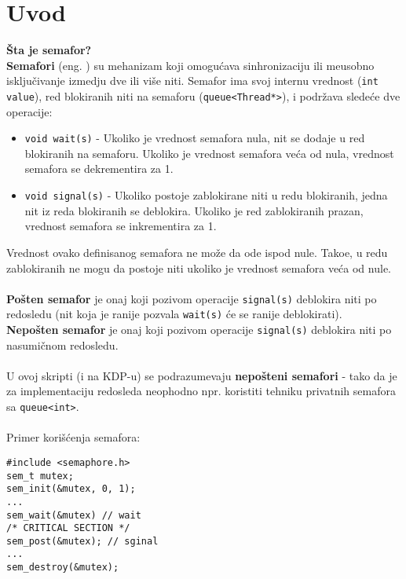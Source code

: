 \section{Uvod}
\textbf{\v{S}ta je semafor?}\\
\textbf{Semafori} (eng. ) su mehanizam koji omogu\'{c}ava sinhronizaciju ili me\dj{}usobno isklju\v{c}ivanje izmedju dve ili vi\v{s}e niti. Semafor ima svoj internu vrednost (\texttt{int value}), red blokiranih niti na semaforu (\texttt{queue<Thread*>}), i podr\v{z}ava slede\'{c}e dve operacije:
\begin{itemize}
    \item \texttt{void wait(s)} - Ukoliko je vrednost semafora nula, nit se dodaje u red blokiranih na semaforu. Ukoliko je vrednost semafora ve\'{c}a od nula, vrednost semafora se dekrementira za 1.
    \item \texttt{void signal(s)} - Ukoliko postoje zablokirane niti u redu blokiranih, jedna nit iz reda blokiranih se deblokira. Ukoliko je red zablokiranih prazan, vrednost semafora se inkrementira za 1.
\end{itemize}
Vrednost ovako definisanog semafora ne mo\v{z}e da ode ispod nule. Tako\dj{}e, u redu zablokiranih ne mogu da postoje niti ukoliko je vrednost semafora ve\'{c}a od nule.
\\\\
\textbf{Po\v{s}ten semafor} je onaj koji pozivom operacije \texttt{signal(s)} deblokira niti po  redosledu (nit koja je ranije pozvala \texttt{wait(s)} \'{c}e se ranije deblokirati).\\
\textbf{Nepo\v{s}ten semafor} je onaj koji pozivom operacije \texttt{signal(s)} deblokira niti po nasumi\v{c}nom redosledu.\\\\
U ovoj skripti (i na KDP-u) se podrazumevaju \textbf{nepo\v{s}teni semafori} - tako da je za implementaciju  redosleda neophodno npr. koristiti tehniku privatnih semafora sa \texttt{queue<int>}.
\\\\
Primer kori\v{s}\'{c}enja  semafora:
\begin{lstlisting}
#include <semaphore.h>
sem_t mutex;
sem_init(&mutex, 0, 1);
...
sem_wait(&mutex) // wait 
/* CRITICAL SECTION */
sem_post(&mutex); // sginal
...
sem_destroy(&mutex);
\end{lstlisting}